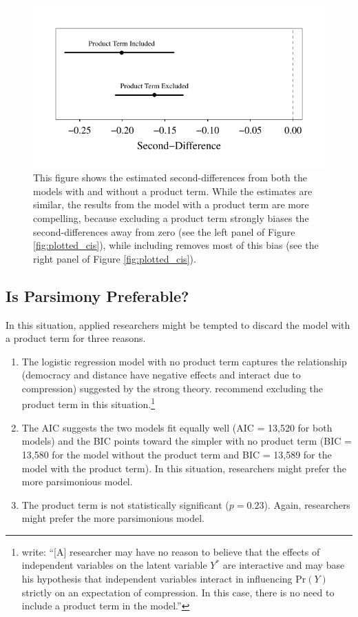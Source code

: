 \documentclass[12pt]{article}
\begin{document}
        \begin{figure}[h]
        \begin{center}
        \includegraphics[scale = .8]{fig/sd_distance.pdf}
        \end{center}\caption{This figure shows the estimated second-differences from both the models with and without a product term. While the estimates are similar, the results from the model with a product term are more compelling, because excluding a product term strongly biases the second-differences away from zero (see the left panel of Figure \ref{fig:plotted_cis}), while including removes most of this bias (see the right panel of Figure \ref{fig:plotted_cis}). }\label{fig:sd_distance}
        \end{figure}

\subsection*{Is Parsimony Preferable?}

In this situation, applied researchers might be tempted to discard the model with a product term for three reasons.
\singlespace\vspace{-3mm}
\begin{enumerate}
\item The logistic regression model with no product term captures the relationship (democracy and distance have negative effects and interact due to compression) suggested by the strong theory. \cite{BerryDeMerittEsarey2010} recommend excluding the product term in this situation.\footnote{\cite{BerryDeMerittEsarey2010} write: ``[A] researcher may have no reason to believe that the effects of independent variables on the latent variable $Y^*$ are interactive and may base his hypothesis that independent variables interact in influencing $\text{Pr}(Y)$ strictly on an expectation of compression. In this case, there is no need to include a product term in the model.''}
\item The AIC suggests the two models fit equally well (AIC = 13,520 for both models) and the BIC points toward the simpler with no product term (BIC = 13,580 for the model without the product term and BIC = 13,589 for the model with the product term). In this situation, researchers might prefer the more parsimonious model.
\item The product term is not statistically significant ($p = 0.23$). Again, researchers might prefer the more parsimonious model.
\end{enumerate}
\doublespace
\end{document}
